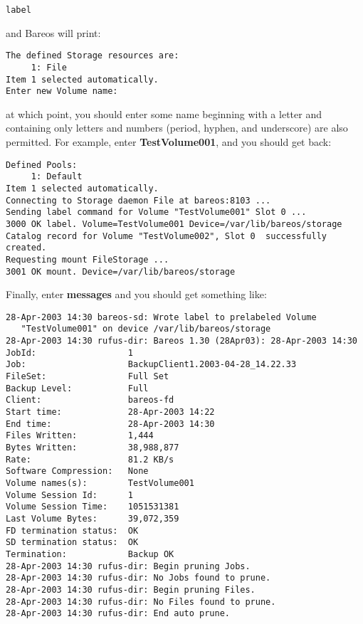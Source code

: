 \footnotesize
\begin{verbatim}
label
\end{verbatim}
\normalsize

and Bareos will print:

\footnotesize
\begin{verbatim}
The defined Storage resources are:
     1: File
Item 1 selected automatically.
Enter new Volume name:
\end{verbatim}
\normalsize

at which point, you should enter some name beginning with a letter and
containing only letters and numbers (period, hyphen, and underscore) are also
permitted. For example, enter {\bf TestVolume001}, and you should get back:

\footnotesize
\begin{verbatim}
Defined Pools:
     1: Default
Item 1 selected automatically.
Connecting to Storage daemon File at bareos:8103 ...
Sending label command for Volume "TestVolume001" Slot 0 ...
3000 OK label. Volume=TestVolume001 Device=/var/lib/bareos/storage
Catalog record for Volume "TestVolume002", Slot 0  successfully created.
Requesting mount FileStorage ...
3001 OK mount. Device=/var/lib/bareos/storage
\end{verbatim}
\normalsize

Finally, enter {\bf messages} and you should get something like:

\footnotesize
\begin{verbatim}
28-Apr-2003 14:30 bareos-sd: Wrote label to prelabeled Volume
   "TestVolume001" on device /var/lib/bareos/storage
28-Apr-2003 14:30 rufus-dir: Bareos 1.30 (28Apr03): 28-Apr-2003 14:30
JobId:                  1
Job:                    BackupClient1.2003-04-28_14.22.33
FileSet:                Full Set
Backup Level:           Full
Client:                 bareos-fd
Start time:             28-Apr-2003 14:22
End time:               28-Apr-2003 14:30
Files Written:          1,444
Bytes Written:          38,988,877
Rate:                   81.2 KB/s
Software Compression:   None
Volume names(s):        TestVolume001
Volume Session Id:      1
Volume Session Time:    1051531381
Last Volume Bytes:      39,072,359
FD termination status:  OK
SD termination status:  OK
Termination:            Backup OK
28-Apr-2003 14:30 rufus-dir: Begin pruning Jobs.
28-Apr-2003 14:30 rufus-dir: No Jobs found to prune.
28-Apr-2003 14:30 rufus-dir: Begin pruning Files.
28-Apr-2003 14:30 rufus-dir: No Files found to prune.
28-Apr-2003 14:30 rufus-dir: End auto prune.
\end{verbatim}
\normalsize

